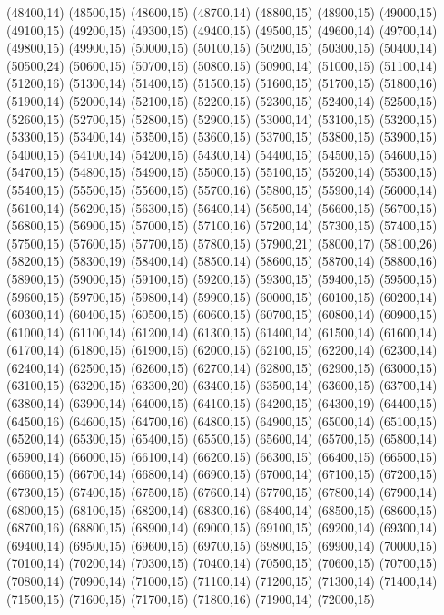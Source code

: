 (48400,14)
(48500,15)
(48600,15)
(48700,14)
(48800,15)
(48900,15)
(49000,15)
(49100,15)
(49200,15)
(49300,15)
(49400,15)
(49500,15)
(49600,14)
(49700,14)
(49800,15)
(49900,15)
(50000,15)
(50100,15)
(50200,15)
(50300,15)
(50400,14)
(50500,24)
(50600,15)
(50700,15)
(50800,15)
(50900,14)
(51000,15)
(51100,14)
(51200,16)
(51300,14)
(51400,15)
(51500,15)
(51600,15)
(51700,15)
(51800,16)
(51900,14)
(52000,14)
(52100,15)
(52200,15)
(52300,15)
(52400,14)
(52500,15)
(52600,15)
(52700,15)
(52800,15)
(52900,15)
(53000,14)
(53100,15)
(53200,15)
(53300,15)
(53400,14)
(53500,15)
(53600,15)
(53700,15)
(53800,15)
(53900,15)
(54000,15)
(54100,14)
(54200,15)
(54300,14)
(54400,15)
(54500,15)
(54600,15)
(54700,15)
(54800,15)
(54900,15)
(55000,15)
(55100,15)
(55200,14)
(55300,15)
(55400,15)
(55500,15)
(55600,15)
(55700,16)
(55800,15)
(55900,14)
(56000,14)
(56100,14)
(56200,15)
(56300,15)
(56400,14)
(56500,14)
(56600,15)
(56700,15)
(56800,15)
(56900,15)
(57000,15)
(57100,16)
(57200,14)
(57300,15)
(57400,15)
(57500,15)
(57600,15)
(57700,15)
(57800,15)
(57900,21)
(58000,17)
(58100,26)
(58200,15)
(58300,19)
(58400,14)
(58500,14)
(58600,15)
(58700,14)
(58800,16)
(58900,15)
(59000,15)
(59100,15)
(59200,15)
(59300,15)
(59400,15)
(59500,15)
(59600,15)
(59700,15)
(59800,14)
(59900,15)
(60000,15)
(60100,15)
(60200,14)
(60300,14)
(60400,15)
(60500,15)
(60600,15)
(60700,15)
(60800,14)
(60900,15)
(61000,14)
(61100,14)
(61200,14)
(61300,15)
(61400,14)
(61500,14)
(61600,14)
(61700,14)
(61800,15)
(61900,15)
(62000,15)
(62100,15)
(62200,14)
(62300,14)
(62400,14)
(62500,15)
(62600,15)
(62700,14)
(62800,15)
(62900,15)
(63000,15)
(63100,15)
(63200,15)
(63300,20)
(63400,15)
(63500,14)
(63600,15)
(63700,14)
(63800,14)
(63900,14)
(64000,15)
(64100,15)
(64200,15)
(64300,19)
(64400,15)
(64500,16)
(64600,15)
(64700,16)
(64800,15)
(64900,15)
(65000,14)
(65100,15)
(65200,14)
(65300,15)
(65400,15)
(65500,15)
(65600,14)
(65700,15)
(65800,14)
(65900,14)
(66000,15)
(66100,14)
(66200,15)
(66300,15)
(66400,15)
(66500,15)
(66600,15)
(66700,14)
(66800,14)
(66900,15)
(67000,14)
(67100,15)
(67200,15)
(67300,15)
(67400,15)
(67500,15)
(67600,14)
(67700,15)
(67800,14)
(67900,14)
(68000,15)
(68100,15)
(68200,14)
(68300,16)
(68400,14)
(68500,15)
(68600,15)
(68700,16)
(68800,15)
(68900,14)
(69000,15)
(69100,15)
(69200,14)
(69300,14)
(69400,14)
(69500,15)
(69600,15)
(69700,15)
(69800,15)
(69900,14)
(70000,15)
(70100,14)
(70200,14)
(70300,15)
(70400,14)
(70500,15)
(70600,15)
(70700,15)
(70800,14)
(70900,14)
(71000,15)
(71100,14)
(71200,15)
(71300,14)
(71400,14)
(71500,15)
(71600,15)
(71700,15)
(71800,16)
(71900,14)
(72000,15)
